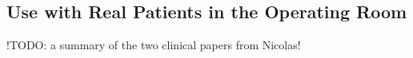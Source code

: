 
\subsection{Use with Real Patients in the Operating Room}
!TODO: a summary of the two clinical papers from  Nicolas!